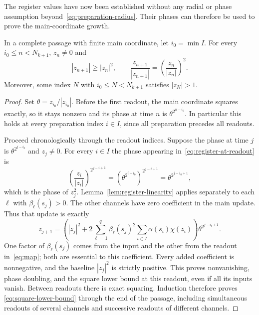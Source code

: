 The register values have now been established without any radial or phase
assumption beyond~\eqref{eq:preparation-radius}.  Their phases can therefore
be used to prove the main-coordinate growth.

\begin{lemma}\label{lem:passage-escape}
In a complete passage with finite main coordinate, let $i_0=\min I$.
For every $i_0\le n<N_{k+1}$, $z_n\ne0$ and
\begin{equation}\label{eq:square-lower-bound}
 |z_{n+1}|\ge |z_n|^2,
 \qquad
 \frac{z_{n+1}}{|z_{n+1}|}
   =\left(\frac{z_n}{|z_n|}\right)^2.
\end{equation}
Moreover, some index $N$ with $i_0\le N<N_{k+1}$ satisfies $|z_N|>1$.
\end{lemma}

\begin{proof}
Set $\theta=z_{i_0}/|z_{i_0}|$.  Before the first readout, the main
coordinate squares exactly, so it stays nonzero and its phase at time $n$
is $\theta^{2^{n-i_0}}$.  In particular this holds at every preparation
index $i\in I$, since all preparation precedes all readouts.

Proceed chronologically through the readout indices.  Suppose the phase at
time $j$ is $\theta^{2^{j-i_0}}$ and $z_j\ne0$.  For every $i\in I$ the
phase appearing in~\eqref{eq:register-at-readout} is
\[
 \left(\frac{z_i}{|z_i|}\right)^{2^{j-i+1}}
 =\left(\theta^{2^{i-i_0}}\right)^{2^{j-i+1}}
 =\theta^{2^{j-i_0+1}},
\]
which is the phase of $z_j^2$.  Lemma~\ref{lem:register-linearity} applies
separately to each $\ell$ with $\beta_\ell(s_j)>0$.  The other channels have zero
coefficient in the main update.  Thus that update is exactly
\begin{equation}\label{eq:aligned-main-update}
 z_{j+1}=
 \left(
 |z_j|^2+
 2\sum_{\ell=1}^q\beta_\ell(s_j)^2
       \sum_{i\in I}\alpha(s_i)\chi(z_i)
 \right)\theta^{2^{j-i_0+1}}.
\end{equation}
One factor of $\beta_\ell(s_j)$ comes from the input and the other from the
readout in~\eqref{eq:map}; both are essential to this coefficient.
Every added coefficient is nonnegative, and the baseline $|z_j|^2$ is
strictly positive.  This proves nonvanishing, phase doubling, and the
square lower bound at this readout, even if all its inputs vanish.
Between readouts there is exact squaring.  Induction therefore proves
\eqref{eq:square-lower-bound} through the end of the passage, including
simultaneous readouts of several channels and successive readouts of
different channels.


\end{proof}
